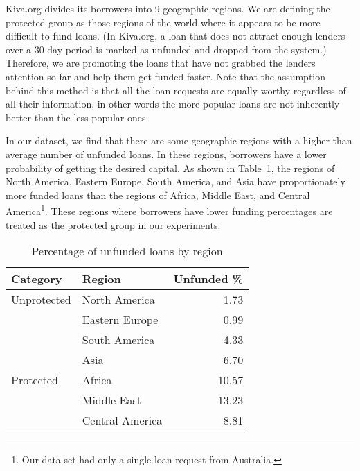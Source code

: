         Kiva.org divides its borrowers into 9 geographic regions. We are defining the protected group as those regions of the world where it appears to be more difficult to fund loans. (In Kiva.org, a loan that does not attract enough lenders over a 30 day period is marked as unfunded and dropped from the system.) Therefore, we are promoting the loans that have not grabbed the lenders attention so far and help them get funded faster. Note that the assumption behind this method is that all the loan requests are equally worthy regardless of all their information, in other words the more popular loans are not inherently better than the less popular ones.
        
        In our dataset, we find that there are some geographic regions with a higher than average number of unfunded loans. In these regions, borrowers have a lower probability of getting the desired capital. As shown in Table~\ref{tab:unfunded}, the regions of North America, Eastern Europe, South America, and Asia have proportionately more funded loans than the regions of Africa, Middle East, and Central America\footnote{Our data set had only a single loan request from Australia.}. These regions where borrowers have lower funding percentages are treated as the protected group in our experiments.
        
        \begin{table}
            \centering
        \begin{tabular}{l|l|r}
            Category & Region & Unfunded \% \\ \hline
            Unprotected & North America & 1.73 \\
            & Eastern Europe & 0.99 \\
            & South America & 4.33 \\
            & Asia & 6.70 \\ \hline
            Protected & Africa & 10.57 \\
            & Middle East & 13.23 \\
            & Central America & 8.81 \\
        \end{tabular}
            \caption{Percentage of unfunded loans by region}
            \label{tab:unfunded}
        \end{table}
 


